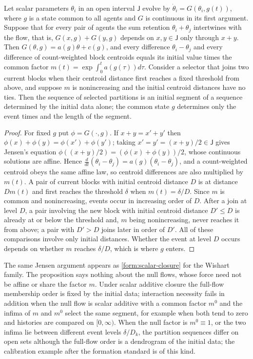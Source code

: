 Let scalar parameters $\theta_i$ in an open interval $\mathsf J$ evolve by
$\dot\theta_i=G(\theta_i,g(t))$, where $g$ is a state common to all agents and
$G$ is continuous in its first argument. Suppose that for every pair of
agents the sum retention $\theta_i+\theta_j$ intertwines with the flow, that
is, $G(x,g)+G(y,g)$ depends on $x,y\in\mathsf J$ only through $x+y$. Then
$G(\theta,g)=a(g)\theta+c(g)$, and every difference $\theta_i-\theta_j$ and
every difference of count-weighted block centroids equals its initial value
times the common factor $m(t)=\exp\int_0^ta(g(\tau))d\tau$. Consider a
selector that joins two current blocks when their centroid distance first
reaches a fixed threshold from above, and suppose $m$ is nonincreasing and
the initial centroid distances have no ties. Then the sequence of selected
partitions is an initial segment of a sequence determined by the initial
data alone; the common state $g$ determines only the event times and the
length of the segment.
\begin{proof}
For fixed $g$ put $\phi=G(\cdot,g)$. If $x+y=x'+y'$ then
$\phi(x)+\phi(y)=\phi(x')+\phi(y')$; taking $x'=y'=(x+y)/2\in\mathsf J$ gives
Jensen's equation $\phi((x+y)/2)=(\phi(x)+\phi(y))/2$, whose continuous
solutions are affine. Hence $\frac{d}{dt}(\theta_i-\theta_j)=a(g)(\theta_i-\theta_j)$,
and a count-weighted centroid obeys the same affine law, so centroid
differences are also multiplied by $m(t)$. A pair of current blocks with
initial centroid distance $D$ is at distance $Dm(t)$ and first reaches the
threshold $\delta$ when $m(t)=\delta/D$. Since $m$ is common and
nonincreasing, events occur in increasing order of $D$. After a join at
level $D$, a pair involving the new block with initial centroid distance
$D'\leq D$ is already at or below the threshold and, $m$ being
nonincreasing, never reaches it from above; a pair with $D'>D$ joins later in
order of $D'$. All of these comparisons involve only initial distances.
Whether the event at level $D$ occurs depends on whether $m$ reaches
$\delta/D$, which is where $g$ enters.
\end{proof}

The same Jensen argument appears as \cref{form:scalar-closure} for the
Wishart family. The proposition says nothing about the null flows, whose
force need not be affine or share the factor $m$. Under scalar additive
closure the full-flow membership order is fixed by the initial data;
interaction necessity fails in addition when the null flow is scalar
additive with a common factor $m^0$ and the infima of $m$ and $m^0$ select
the same segment, for example when both tend to zero and histories are
compared on $[0,\infty)$. When the null factor is $m^0\equiv1$, or the two
infima lie between different event levels $\delta/D_k$, the partition
sequences differ on open sets although the full-flow order is a dendrogram
of the initial data; the calibration example after the formation standard is
of this kind.

